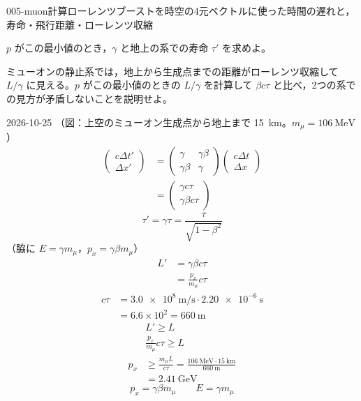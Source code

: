 \documentclass[uplatex,dvipdfmx,a4paper,11pt]{jsarticle}
\begin{document}
\begin{mondai}{005-muon}{計算}{ローレンツブーストを時空の4元ベクトルに使った時間の遅れと，寿命・飛行距離・ローレンツ収縮}
\begin{shoumon}
    \item $p$ がこの最小値のとき，$\gamma$ と地上の系での寿命 $\tau'$ を求めよ。
    \item \hanigai ミューオンの静止系では，地上から生成点までの距離がローレンツ収縮して $L/\gamma$ に見える。$p$ がこの最小値のときの $L/\gamma$ を計算して $\beta c\tau$ と比べ，2つの系での見方が矛盾しないことを説明せよ。
  \end{shoumon}
\begin{kotaeutsushi}{2026-10-25}
（図：上空のミューオン生成点から地上まで \qty{15}{\kilo\metre}。$m_{\mu}=\qty{106}{\mega\electronvolt}$）
\begin{align*}
  \begin{pmatrix}c\Delta t'\\ \Delta x'\end{pmatrix}
  &=\begin{pmatrix}\gamma&\gamma\beta\\ \gamma\beta&\gamma\end{pmatrix}\begin{pmatrix}c\Delta t\\ \Delta x\end{pmatrix}\\
  &=\begin{pmatrix}\gamma c\tau\\ \gamma\beta c\tau\end{pmatrix}
\end{align*}
\[ \tau'=\gamma\tau=\frac{\tau}{\sqrt{1-\beta^{2}}} \]
（脇に $E=\gamma m_{\mu}$，$p_{x}=\gamma\beta m_{\mu}$）
\begin{align*}
  L'&=\gamma\beta c\tau\\
  &=\frac{p_{x}}{m_{\mu}}c\tau
\end{align*}
\begin{align*}
  c\tau&=\qty{3.0e8}{\metre\per\second}\cdot\qty{2.20e-6}{\second}\\
  &=6.6\times10^{2}=\qty{660}{\metre}
\end{align*}
\begin{align*}
  &L'\ge L\\
  &\frac{p_{x}}{m_{\mu}}c\tau\ge L\\
  p_{x}&\ge\frac{m_{\mu}L}{c\tau}=\frac{\qty{106}{\mega\electronvolt}\cdot\qty{15}{\kilo\metre}}{\qty{660}{\metre}}\\
  &=\qty{2.41}{\giga\electronvolt}
\end{align*}
\[ p_{x}=\gamma\beta m_{\mu}\qquad E=\gamma m_{\mu} \]

\end{kotaeutsushi}
\end{mondai}
\end{document}
